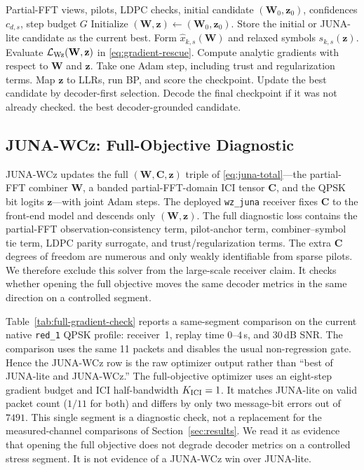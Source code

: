 \documentclass[journal]{IEEEtran}
\newcommand{\junalite}{JUNA-lite}
\newcommand{\junawz}{JUNA-Wz}
\newcommand{\junawcz}{JUNA-WCz}
\begin{document}
\begin{algorithm}[t]
\caption{\junawz{} robust reduced-gradient refinement}
\label{alg:junawz}
\footnotesize
\begin{algorithmic}[1]
\Require Partial-FFT views, pilots, LDPC checks, initial candidate
  \((\mathbf W_0,\mathbf z_0)\), confidences \(c_{d,s}\), step budget \(G\)
\State Initialize \((\mathbf W,\mathbf z)\gets(\mathbf W_0,\mathbf z_0)\).
\State Store the initial or \junalite{} candidate as the current best.
  \State Form \(\widehat x_{k,s}(\mathbf W)\) and relaxed symbols
    \(s_{k,s}(\mathbf z)\).
  \State Evaluate \(\mathcal L_{\rm Wz}(\mathbf W,\mathbf z)\) in
    \eqref{eq:gradient-rescue}.
  \State Compute analytic gradients with respect to \(\mathbf W\) and
    \(\mathbf z\).
  \State Take one Adam step, including trust and regularization terms.
    \State Map \(\mathbf z\) to LLRs, run BP, and score the checkpoint.
    \State Update the best candidate by decoder-first selection.
  \EndIf
\EndFor
\State Decode the final checkpoint if it was not already checked.
\State \Return the best decoder-grounded candidate.
\end{algorithmic}
\end{algorithm}

\subsection{\texorpdfstring{\junawcz{}}{JUNA-WCz}: Full-Objective Diagnostic}
\junawcz{} updates the full $(\mathbf W,\mathbf C,\mathbf z)$ triple of
\eqref{eq:juna-total}---the partial-FFT combiner $\mathbf W$, a banded
partial-FFT-domain ICI tensor $\mathbf C$, and the QPSK bit logits $\mathbf z$---with
joint Adam steps. The deployed \texttt{wz\_juna} receiver fixes $\mathbf C$ to the
front-end model and descends only $(\mathbf W,\mathbf z)$. The full diagnostic
loss contains the partial-FFT observation-consistency term, pilot-anchor term,
combiner--symbol tie term, LDPC parity surrogate, and trust/regularization
terms. The extra $\mathbf C$ degrees of freedom are numerous and only weakly
identifiable from sparse pilots. We therefore exclude this solver from the
large-scale receiver claim. It checks whether opening the full objective moves
the same decoder metrics in the same direction on a controlled segment.

Table~\ref{tab:full-gradient-check} reports a same-segment comparison on the
current native \texttt{red\_1} QPSK profile: receiver~1, replay time
$0$--$4$\,s, and 30\,dB SNR. The comparison uses the same 11 packets and
disables the usual non-regression gate. Hence the \junawcz{} row is the raw
optimizer output rather than ``best of \junalite{} and \junawcz{}.'' The
full-objective optimizer uses an eight-step gradient budget and ICI
half-bandwidth $K_{\rm ICI}=1$. It matches \junalite{} on valid packet count
($1/11$ for both) and differs by only two message-bit errors out of $7491$.
This single segment is a diagnostic check, not a replacement for the
measured-channel comparisons of Section~\ref{sec:results}. We read it as
evidence that opening the full objective does not degrade decoder metrics on a
controlled stress segment. It is not evidence of a \junawcz{} win over
\junalite{}.
\end{document}
